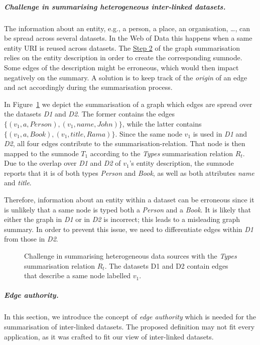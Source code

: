 \subparagraph{Challenge in summarising heterogeneous inter-linked datasets.}

The information about an entity, e.g., a person, a place, an organisation, \ldots, can be spread across several datasets. In the Web of Data this happens when a same entity URI is reused across datasets. The \hyperref[step-hn]{Step 2} of the graph summarisation relies on the entity description  in order to create the corresponding sumnode. Some edges of the description might be erroneous, which would then impact negatively on the summary. A solution is to keep track of the \emph{origin} of an edge and act accordingly during the summarisation process.

In Figure~\ref{fig:sum-issue} we depict the summarisation of a graph which edges are spread over the datasets \emph{D1} and \emph{D2}. The former contains the edges $\{ (v_1, a, Person), (v_1, name, John) \}$, while the latter contains $\{ (v_1, a, Book), (v_1, title, Rama) \}$. Since the same node $v_1$ is used in \emph{D1} and \emph{D2}, all four edges contribute to the \gls{summarisation-relation}. That node is then mapped to the sumnode $T_1$ according to the \emph{Types} summarisation relation $R_t$.
Due to the overlap over \emph{D1} and \emph{D2} of $v_1$'s entity description, the sumnode reports that it is of both types \emph{Person} and \emph{Book}, as well as both \gls{attributes} \emph{name} and \emph{title}.

Therefore, information about an entity within a dataset can be erroneous since it is unlikely that a same node is typed both a \emph{Person} and a \emph{Book}. It is likely that either the graph in \emph{D1} or in \emph{D2} is incorrect; this leads to a misleading graph summary.
In order to prevent this issue, we need to differentiate edges within \emph{D1} from those in \emph{D2}.

\begin{figure}
	\centering
	\resizebox{.8\textwidth}{!}{
		
	}
	\caption[Challenge in summarising heterogeneous data sources with the \emph{Types} summarisation relation $R_t$]{Challenge in summarising heterogeneous data sources with the \emph{Types} summarisation relation $R_t$. The datasets D1 and D2 contain edges that describe a same node labelled $v_1$.}
	\label{fig:sum-issue}
\end{figure}

\subparagraph{Edge authority.}

In this section, we introduce the concept of \emph{edge authority} which is needed for the summarisation of inter-linked datasets. The proposed definition may not fit every application, as it was crafted to fit our view of inter-linked datasets.


